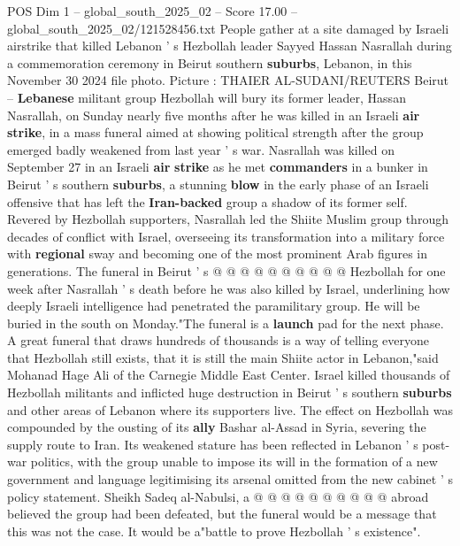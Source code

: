 \begin{textsample}{POS Dim 1 – global\_south\_2025\_02 – Score 17.00 – global\_south\_2025\_02/121528456.txt}  \label{ex:f1_pos_361}
People gather at a site damaged by Israeli airstrike that killed Lebanon ' s Hezbollah leader Sayyed Hassan Nasrallah during a commemoration ceremony in Beirut southern \textbf{suburbs}, Lebanon, in this November 30 2024 file photo.
Picture : THAIER AL-SUDANI/REUTERS Beirut -- \textbf{Lebanese} militant group Hezbollah will bury its former leader, Hassan Nasrallah, on Sunday nearly five months after he was killed in an Israeli \textbf{air} \textbf{strike}, in a mass funeral aimed at showing political strength after the group emerged badly weakened from last year ' s war.
Nasrallah was killed on September 27 in an Israeli \textbf{air} \textbf{strike} as he met \textbf{commanders} in a bunker in Beirut ' s southern \textbf{suburbs}, a stunning \textbf{blow} in the early phase of an Israeli offensive that has left the \textbf{Iran-backed} group a shadow of its former self.
Revered by Hezbollah supporters, Nasrallah led the Shiite Muslim group through decades of conflict with Israel, overseeing its transformation into a military force with \textbf{regional} sway and becoming one of the most prominent Arab figures in generations.
The funeral in Beirut ' s @ @ @ @ @ @ @ @ @ @ Hezbollah for one week after Nasrallah ' s death before he was also killed by Israel, underlining how deeply Israeli intelligence had penetrated the paramilitary group.
He will be buried in the south on Monday."The funeral is a \textbf{launch} pad for the next phase.
A great funeral that draws hundreds of thousands is a way of telling everyone that Hezbollah still exists, that it is still the main Shiite actor in Lebanon,"said Mohanad Hage Ali of the Carnegie Middle East Center.
Israel killed thousands of Hezbollah militants and inflicted huge destruction in Beirut ' s southern \textbf{suburbs} and other areas of Lebanon where its supporters live.
The effect on Hezbollah was compounded by the ousting of its \textbf{ally} Bashar al-Assad in Syria, severing the supply route to Iran.
Its weakened stature has been reflected in Lebanon ' s post-war politics, with the group unable to impose its will in the formation of a new government and language legitimising its arsenal omitted from the new cabinet ' s policy statement.
Sheikh Sadeq al-Nabulsi, a @ @ @ @ @ @ @ @ @ @ abroad believed the group had been defeated, but the funeral would be a message that this was not the case.
It would be a"battle to prove Hezbollah ' s existence".

\end{textsample}
